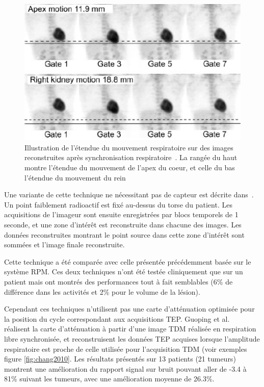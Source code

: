 \begin{figure}[h!]
	\begin{center}
		\includegraphics[width=12cm]{images/gatingBoucher2004}
	\end{center}
	\caption{Illustration de l'étendue du mouvement respiratoire sur des images reconstruites après synchronisation respiratoire~\cite{boucher2004respiratory}. La rangée du haut montre l'étendue du mouvement de l'apex du coeur, et celle du bas l'étendue du mouvement du rein} 
	\label{fig:boucher2004}
\end{figure}

Une variante de cette technique ne nécessitant pas de capteur est décrite dans~\cite{nehmeh2003reduction}. Un point faiblement radioactif est fixé au-dessus du torse du patient. Les acquisitions de l'imageur sont ensuite enregistrées par blocs temporels de 1 seconde, et une zone d'intérêt est reconstruite dans chacune des images. Les données reconstruites montrant le point source dans cette zone d'intérêt sont sommées et l'image finale reconstruite. 

Cette technique a été comparée avec celle présentée précédemment basée sur le système RPM. Ces deux techniques n'ont été testée cliniquement que sur un patient mais ont montrés des performances tout à fait semblables (6\% de différence dans les activités et 2\% pour le volume de la lésion).

Cependant ces techniques n'utilisent pas une carte d'atténuation optimisée pour la position du cycle correspondant aux acquisitions TEP.  Guoping et al.~\cite{GuopingChang2010Implementation} réalisent la carte d'atténuation à partir d'une image TDM réalisée en respiration libre synchronisée, et reconstruisent les données TEP acquises lorsque l'amplitude respiratoire est proche de celle utilisée pour l'acquisition TDM (voir exemples figure \ref{fig:chang2010}. Les résultats présentés sur 13 patients (21 tumeurs) montrent une amélioration du rapport signal sur bruit pouvant aller de -3.4 à 81\% suivant les tumeurs, avec une amélioration moyenne de 26.3\%.

